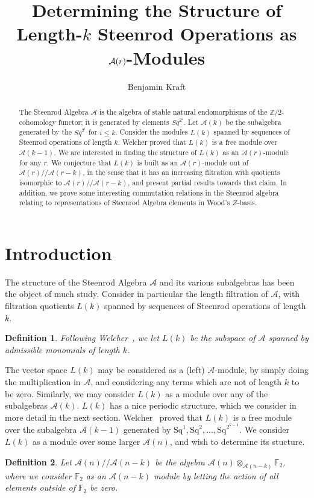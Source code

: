 \documentclass{article}
\title{Determining the Structure of Length-$k$ Steenrod Operations as $\A(r)$-Modules}
\author{Benjamin Kraft}
\newcommand{\A}{\mathcal{A}}
\newcommand{\F}{\mathbb{F}}
\newcommand{\Sq}{\mathrm{Sq}}
\newcommand{\mmod}{/\!/\!}
\newtheorem{defn}{Definition}
\begin{document}
\begin{abstract}
  The Steenrod Algebra $\A$ is the algebra of stable natural endomorphisms of the $\mathbb{Z}/2$-cohomology functor; it is generated by elements $Sq^{2^i}$.  Let $\A(k)$ be the subalgebra generated by the $Sq^{2^i}$ for $i\leq k$.  Consider the modules $L(k)$ spanned by sequences of Steenrod operations of length $k$.  Welcher proved that $L(k)$ is a free module over $\A(k-1)$.  We are interested in finding the structure of $L(k)$ as an $\A(r)$-module for any $r$.  We conjecture that $L(k)$ is built as an $\A(r)$-module out of $\A(r)\mmod\A(r-k)$, in the sense that it has an increasing filtration with quotients isomorphic to $\A(r)\mmod\A(r-k)$, and present partial results towards that claim.  In addition, we prove some interesting commutation relations in the Steenrod algebra relating to representations of Steenrod Algebra elements in Wood's $Z$-basis.
\end{abstract}

\section{Introduction}

The structure of the Steenrod Algebra $\A$ and its various subalgebras has been the object of much study.  Consider in particular the length filtration of $\A$, with filtration quotients $L(k)$ spanned by sequences of Steenrod operations of length $k$.

\begin{defn}
  Following Welcher~\cite{welcher}, we let $L(k)$ be the subspace of $\A$ spanned by admissible monomials of length $k$.
\end{defn}

The vector space $L(k)$ may be considered as a (left) $\A$-module, by simply doing the multiplication in $\A$, and considering any terms which are not of length $k$ to be zero.  Similarly, we may consider $L(k)$ as a module over any of the subalgebras $\A(k)$.  $L(k)$ has a nice periodic structure, which we consider in more detail in the next section.  Welcher~\cite{welcher} proved that $L(k)$ is a free module over the subalgebra $\A(k-1)$ generated by $\Sq^1, \Sq^2, \ldots, \Sq^{2^{k-1}}$.  We consider $L(k)$ as a module over some larger $\A(n)$, and wish to determine its stucture.

\begin{defn}
  Let $\A(n)\mmod\A(n-k)$ be the algebra $\A(n)\otimes_{\A(n-k)}\F_2$, where we consider $\F_2$ as an $\A(n-k)$ module by letting the action of all elements outside of $\F_2$ be zero.
\end{defn}
\end{document}
